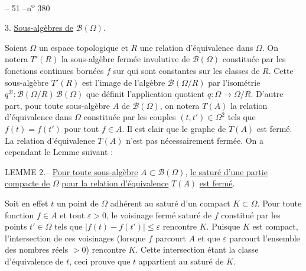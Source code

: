 \begin{center}-- 51 --\hfill n\textsuperscript{o} 380\end{center}
3. \uline{Sous-algèbres de} $\mathcal B(\Omega)$.

Soient $\Omega$ un espace topologique et $R$ une relation d'équivalence dans $\Omega$. On notera $T'(R)$ la sous-algèbre fermée involutive de $\mathcal B(\Omega)$ constituée par les fonctions continues bornées $f$ sur \qquad qui sont constantes sur les classes de $R$. Cette sous-algèbre $T'(R)$ est l'image de l'algèbre $\mathcal B(\Omega/R)$ par l'isométrie $q^{\mathcal B}:\mathcal B(\Omega/R)\,\mathcal B(\Omega)$ que définit l'application quotient $q:\Omega\longrightarrow\Omega/R$. D'autre part, pour toute sous-algèbre $A$ de $\mathcal B(\Omega)$, on notera $T(A)$ la relation d'équivalence dans $\Omega$ constituée par les couples $(t,t')\in\Omega^2$ tels que $f(t)=f(t')$ pour tout $f\in A$. Il est clair que le graphe de $T(A)$ est fermé. La relation d'équivalence $T(A)$ n'est pas nécessairement fermée. On a cependant le Lemme suivant :

LEMME 2.-- \uline{Pour toute sous-algèbre} $A\subset\mathcal B(\Omega)$, \uline{le saturé d'une partie compacte de} $\Omega$ \uline{pour la relation d'équivalence} $T(A)$ \uline{est fermé}.

Soit en effet $t$ un point de $\Omega$ adhérent au saturé d'un compact $K\subset\Omega$. Pour toute fonction $f\in A$ et tout $\varepsilon>0$, le voisinage fermé saturé de $f$ constitué par les points $t'\in\Omega$ tels que $|f(t)-f(t')|\leq\varepsilon$ rencontre $K$. Puisque $K$ est compact, l'intersection de ces voisinages (lorsque $f$ parcourt $A$ et que $\varepsilon$ parcourt l'ensemble des nombres réels $>0$) rencontre $K$. Cette intersection étant la classe d'équivalence de $t$, ceci prouve que $t$ appartient au saturé de $K$.

